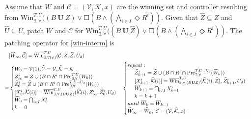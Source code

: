Assume that $ W $ and $ \mathcal{C}=(\mathcal{V},\mathcal{K},x) $ are the winning set and controller resulting from $\text{Win}_{\exists,\forall}^{T,U}((B\mathbf{\ U\ }Z)\vee \Square(B\wedge (\bigwedge_{i\in I} \Diamond R^i)) $. Given that $ \widehat{Z}\subseteq Z $ and $ \widehat{U}\subseteq U $, patch $ W $ and $ \mathcal{C} $ for $\text{Win}_{\exists,\forall}^{T,U}((B\mathbf{\ U\ }\widehat{Z})\vee \Square(B\wedge (\bigwedge_{i\in I} \Diamond R^i)) $. The patching operator for \eqref{win-interm} is 
{\small\begin{align}
&[\widehat{W}_{\infty},\widehat{\mathcal{C}}]=\overline{\text{Win}}^{T, U}_{\exists,\forall (\psi)} (\mathcal{C},Z,\widehat{Z},U_d)\nonumber\\
=&\begin{cases}
W_0 = \mathcal{V}(1),\widehat{\mathcal{V}}=\mathcal{V},\widehat{\mathcal{K}}=\mathcal{K}\\
Z_{\infty}^i = Z\cup (B\cap R^i\cap \text{Pre}_{\exists, \forall}^{T,U}(W_0))\\
\widehat{Z}_{0}^i = \widehat{Z}\cup (B\cap R^i\cap \text{Pre}_{\exists, \forall}^{T,U-U_d}(W_0))\\
[X^i_0,\widehat{\mathcal{K}}(i)] = \overline{\text{Win}}^{T,U}_{\exists,\forall, (B\mathbf{U}Z)}(\widehat{\mathcal{K}}(i),Z_\infty^i,\widehat{Z}_0^i, U_d)\\
\widehat{W}_{0} = \bigcap_{i\in I} X^i_0\\
{\color{black} k=0}
\end{cases}
\begin{cases}
{\color{black} repeat:}\\
\ \ \ \ \widehat{Z}_{k+1}^i = \widehat{Z} \cup (B\cap R^i\cap \text{Pre}_{\exists, \forall}^{T,U-U_d}(\widehat{W}_k))\\
\ \ \ \ [X^i_{k+1},\widehat{\mathcal{K}}(i)]=\overline{\text{Win}}^{T,U}_{\exists,\forall,(B\mathbf{U}Z)}(\widehat{\mathcal{K}}(i),\widehat{Z}_k^i,\widehat{Z}_{k+1}^i, U_d)\\
\ \ \ \ \widehat{W}_{k+1} = \bigcap_{i\in I} X^i_{k+1}\\
\ \ \ \ {\color{black} k = k+1}\\
{\color{black} until \ \widehat{W}_{k}=\widehat{W}_{k-1}}\\
\widehat{W}_\infty = \widehat{W}_k,\ \widehat{\mathcal{C}}=(\widehat{\mathcal{V}},\widehat{\mathcal{K}},x)
\end{cases}\label{patch-interm}
\end{align}
}
